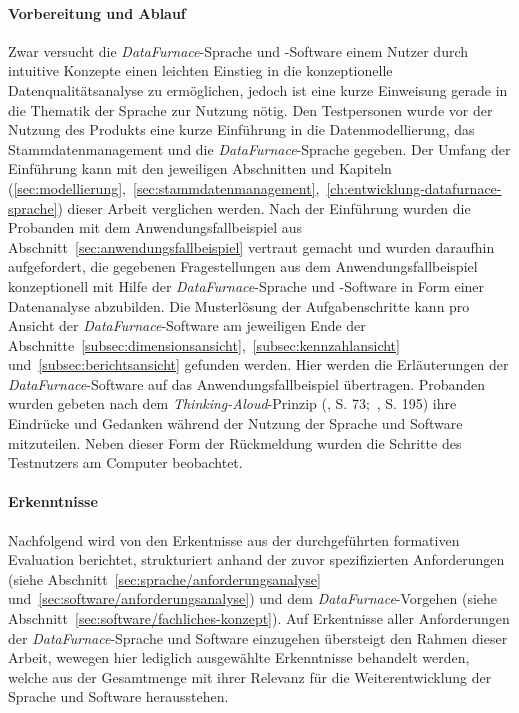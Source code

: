 \documentclass[
  language=german, %
  type=bachelor,%
  ngerman
]{isthesis}
\begin{document}
\begin{content}
\paragraph{Vorbereitung und Ablauf} Zwar versucht die
\textit{DataFurnace}-Sprache und -Software einem Nutzer durch intuitive
Konzepte einen leichten Einstieg in die konzeptionelle Datenqualitätsanalyse zu
ermöglichen, jedoch ist eine kurze Einweisung gerade in die Thematik der
Sprache zur Nutzung nötig. Den Testpersonen wurde vor der Nutzung des Produkts
eine kurze Einführung in die Datenmodellierung, das Stammdatenmanagement und
die \textit{DataFurnace}-Sprache gegeben. Der Umfang der Einführung kann mit
den jeweiligen Abschnitten und Kapiteln
(\ref{sec:modellierung},~\ref{sec:stammdatenmanagement},~\ref{ch:entwicklung-datafurnace-sprache})
dieser Arbeit verglichen werden.  Nach der Einführung wurden die Probanden mit
dem Anwendungsfallbeispiel aus Abschnitt~\ref{sec:anwendungsfallbeispiel}
vertraut gemacht und wurden daraufhin aufgefordert, die gegebenen
Fragestellungen aus dem Anwendungsfallbeispiel konzeptionell mit Hilfe der
\textit{DataFurnace}-Sprache und -Software in Form einer Datenanalyse
abzubilden. Die Musterlösung der Aufgabenschritte kann pro Ansicht der
\textit{DataFurnace}-Software am jeweiligen Ende der
Abschnitte~\ref{subsec:dimensionsansicht},~\ref{subsec:kennzahlansicht}
und~\ref{subsec:berichtsansicht} gefunden werden. Hier werden die Erläuterungen
der \textit{DataFurnace}-Software auf das Anwendungsfallbeispiel übertragen.
Probanden wurden gebeten nach dem \textit{Thinking-Aloud}-Prinzip
(\cite{holzinger2005usability}, S.  73;~\cite{nielsen1994usability}, S. 195)
ihre Eindrücke und Gedanken während der Nutzung der Sprache und Software
mitzuteilen. Neben dieser Form der Rückmeldung wurden die Schritte des
Testnutzers am Computer beobachtet.

\paragraph{Erkenntnisse} Nachfolgend wird von den Erkentnisse aus der
durchgeführten formativen Evaluation berichtet, strukturiert anhand der zuvor
spezifizierten Anforderungen (siehe Abschnitt~\ref{sec:sprache/anforderungsanalyse}
und~\ref{sec:software/anforderungsanalyse}) und dem
\textit{DataFurnace}-Vorgehen (siehe
Abschnitt~\ref{sec:software/fachliches-konzept}). Auf Erkentnisse
aller Anforderungen der \textit{DataFurnace}-Sprache und Software einzugehen
übersteigt den Rahmen dieser Arbeit, wewegen hier lediglich ausgewählte
Erkenntnisse behandelt werden, welche aus der Gesamtmenge mit ihrer
Relevanz für die Weiterentwicklung der Sprache und Software herausstehen.


\end{content}
\end{document}
